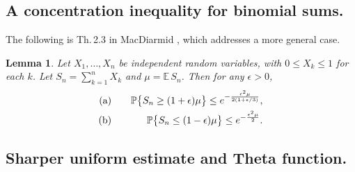 \documentclass[11pt,draft,reqno]{amsart}
\newtheorem{lemma}[theorem]{Lemma}
\theoremstyle{definition}
\theoremstyle{remarks}
\numberwithin{equation}{section}
\def\P{{\mathcal P}}
\def\E{{\mathbb E \,}}
\def\P{{\mathbb P}}
\begin{document}
\subsection{A concentration inequality   for binomial sums.}\label{sub2.2}
 The following  is Th.\,2.3   in MacDiarmid \cite{di}, which addresses a more general case.
\begin{lemma} \label{di.1}
Let $X_1, \dots, X_n$     be independent random variables, with $0 \le X_k \le 1$ for each $k$.
Let $S_n = \sum_{k=1}^n X_k$ and $\mu = \E S_n$. Then for any $\epsilon >0$,
 \begin{eqnarray*}
{\rm (a)}\quad  &&
 \P\big\{S_n \ge  (1+\epsilon)\mu\big\}
    \le  e^{- \frac{\epsilon^2\mu}{2(1+ \epsilon/3) } } ,
    \cr {\rm (b)} \quad & &\P\big\{S_n \le  (1-\epsilon)\mu\big\}\le    e^{- \frac{\epsilon^2\mu}{2}}.
 \end{eqnarray*}
\end{lemma}













\subsection{Sharper uniform estimate and  Theta     function.}
\end{document}
